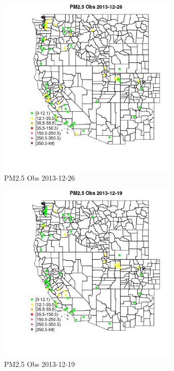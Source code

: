 \begin{figure} 
\centering  
\includegraphics[width=0.77\textwidth]{Code_Outputs/Report_ML_input_PM25_Step4_part_e_de_duplicated_aves_MapObsPM25_Obs2013-12-26.jpg} 
\caption{\label{fig:Report_ML_input_PM25_Step4_part_e_de_duplicated_avesMapObsPM25_Obs2013-12-26}PM2.5 Obs 2013-12-26} 
\end{figure} 
 

\begin{figure} 
\centering  
\includegraphics[width=0.77\textwidth]{Code_Outputs/Report_ML_input_PM25_Step4_part_e_de_duplicated_aves_MapObsPM25_Obs2013-12-19.jpg} 
\caption{\label{fig:Report_ML_input_PM25_Step4_part_e_de_duplicated_avesMapObsPM25_Obs2013-12-19}PM2.5 Obs 2013-12-19} 
\end{figure} 
 

